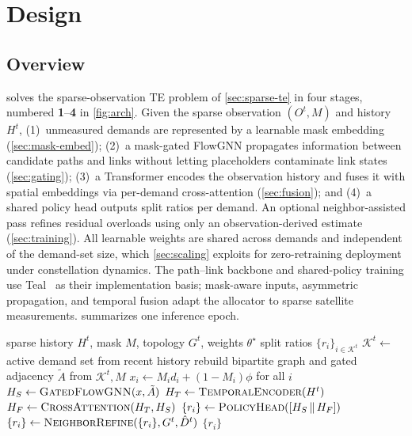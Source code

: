 \section{\sysname{} Design}
\label{sec:design}


\subsection{Overview}
\label{sec:overview}

\sysname{} solves the sparse-observation TE problem of
\cref{sec:sparse-te} in four stages, numbered \textbf{1}--\textbf{4} in
\cref{fig:arch}. Given the sparse observation $(O^t, M)$ and history $H^t$,
(1)~unmeasured demands are represented by a learnable mask embedding
(\cref{sec:mask-embed}); (2)~a mask-gated FlowGNN propagates information
between candidate paths and links without letting placeholders contaminate
link states (\cref{sec:gating}); (3)~a Transformer encodes the observation
history and fuses it with spatial embeddings via per-demand cross-attention
(\cref{sec:fusion}); and (4)~a shared policy head outputs split ratios per
demand. An optional neighbor-assisted pass refines residual overloads using
only an observation-derived estimate (\cref{sec:training}). All learnable
weights are
shared across demands and independent of the demand-set size, which
\cref{sec:scaling} exploits for zero-retraining deployment under
constellation dynamics. The path--link backbone and shared-policy training
use Teal~\cite{teal} as their implementation basis; mask-aware inputs,
asymmetric propagation, and temporal fusion adapt the allocator to sparse
satellite measurements.  summarizes one inference epoch.

\begin{algorithm}[t]
\caption{\sysname{} inference at control epoch $t$}
\label{alg:infer}
\begin{algorithmic}[1]
\Require sparse history $H^t$, mask $M$, topology $G^t$, weights $\theta^\star$
\Ensure split ratios $\{r_i\}_{i\in\mathcal{K}^t}$
\State $\mathcal{K}^t \gets$ active demand set from recent history
\State rebuild bipartite graph and gated adjacency $\tilde{A}$ from
    $\mathcal{K}^t, M$ 
\State $x_i \gets M_i d_i + (1-M_i)\phi$ for all $i$
\State $H_S \gets \textsc{GatedFlowGNN}(x, \tilde{A})$
\State $H_T \gets \textsc{TemporalEncoder}(H^t)$
\State $H_F \gets \textsc{CrossAttention}(H_T, H_S)$ 
\State $\{r_i\} \gets \textsc{PolicyHead}([H_S \,\|\, H_F])$
\State $\{r_i\} \gets \textsc{NeighborRefine}(\{r_i\}, G^t, \hat{D}^t)$
\State \Return $\{r_i\}$
\end{algorithmic}
\end{algorithm}

